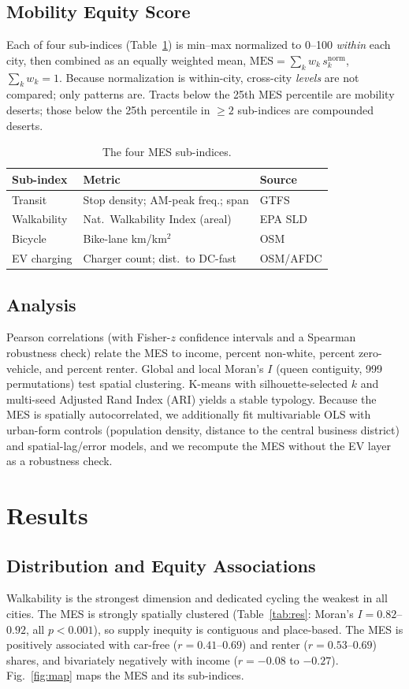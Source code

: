 \documentclass[conference]{IEEEtran}
\begin{document}
\subsection{Mobility Equity Score}
Each of four sub-indices (Table~\ref{tab:sub}) is min--max normalized to
0--100 \emph{within} each city, then combined as an equally weighted mean,
$\mathrm{MES}=\sum_k w_k\, s_k^{\text{norm}}$, $\sum_k w_k=1$. Because
normalization is within-city, cross-city \emph{levels} are not compared; only
patterns are. Tracts below the 25th MES percentile are mobility deserts; those
below the 25th percentile in $\geq 2$ sub-indices are compounded deserts.

\begin{table}[t]
\caption{The four MES sub-indices.}
\label{tab:sub}
\centering
\footnotesize
\begin{tabular}{@{}lll@{}}
\toprule
\textbf{Sub-index} & \textbf{Metric} & \textbf{Source} \\
\midrule
Transit & Stop density; AM-peak freq.; span & GTFS \\
Walkability & Nat.\ Walkability Index (areal) & EPA SLD \\
Bicycle & Bike-lane km/km$^2$ & OSM \\
EV charging & Charger count; dist.\ to DC-fast & OSM/AFDC \\
\bottomrule
\end{tabular}
\end{table}

\subsection{Analysis}
Pearson correlations (with Fisher-$z$ confidence intervals and a Spearman
robustness check) relate the MES to income, percent non-white, percent
zero-vehicle, and percent renter. Global and local Moran's $I$ (queen
contiguity, 999 permutations) test spatial clustering. K-means with
silhouette-selected $k$ and multi-seed Adjusted Rand Index (ARI) yields a stable
typology. Because the MES is spatially autocorrelated, we additionally fit
multivariable OLS with urban-form controls (population density, distance to the
central business district) and spatial-lag/error models, and we recompute the
MES without the EV layer as a robustness check.

\section{Results}
\subsection{Distribution and Equity Associations}
Walkability is the strongest dimension and dedicated cycling the weakest in all
cities. The MES is strongly spatially clustered (Table~\ref{tab:res}: Moran's
$I=0.82$--$0.92$, all $p<0.001$), so supply inequity is contiguous and
place-based. The MES is positively associated with car-free ($r=0.41$--$0.69$)
and renter ($r=0.53$--$0.69$) shares, and bivariately negatively with income
($r=-0.08$ to $-0.27$). Fig.~\ref{fig:map} maps the MES and its sub-indices.
\end{document}
